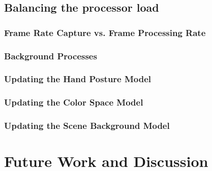 \documentclass[10pt,a4paper]{article}
\begin{document}
\subsection{Balancing the processor load}\label{sec:BalancingTheProcessorLoad}
\subsubsection{Frame Rate Capture vs. Frame Processing Rate}\label{sec:FrameRateCaptureVsFrameProcessingRate}
\subsubsection{Background Processes}\label{sec:BackgroundProcesses}
\subsubsection{Updating the Hand Posture Model}\label{sec:UpdatingTheHandPostureModel}
\subsubsection{Updating the Color Space Model}\label{sec:UpdatingTheColorSpaceModel}
\subsubsection{Updating the Scene Background Model}\label{sec:UpdatingTheSceneBackgroundModel}


\section{Future Work and Discussion}\label{sec:FutureWorkAndDiscussion}




\end{document}
